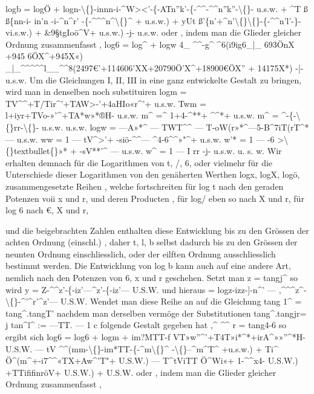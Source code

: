 \documentclass[12pt,a4paper]{article}
\begin{document}
logb  =       logÖ  +  logn-\textbackslash\{\}-innn-i-\^{}W><'-\{-ATn''k'-\{-\^{}\^{}-\^{}\^{}n''k''-\textbackslash\{\}-  u.s.w. +       \^{}T   ß  ß\{nn-i-  in'n  -i-\^{}n\^{}r'  -\{-\^{}\^{}\^{}n\^{}\textbackslash\{\}\^{}  +  u.s.w.) +     yUt    ß'\{n'+\^{}n'\textbackslash\{\}\textbackslash\{\}-\{-\^{}\^{}n'l'-\}-  vi.s.w.) +  \&9§tgIoö\^{}V+  u.s.w.) -j-  u.s.w. oder ,  indem  man  die  Glieder  gleicher  Ordnung  zusammenfasst , log6  =  log\^{}  +  logw 4\_    \^{}\^{}-g\^{}    \^{}6(i9ig6\_|\_    693ÖnX  +945  6ÖX\^{}+945X«) \_|\_\^{}\^{}\^{}\^{}\^{}l\_\_\^{}\^{}8(2497€'+114606'XX+20790Ö'X\^{}+18900€ÖX'' +  14175X*) -|-  u.s.w. Um  die  Gleichungen  I,  II,  III  in  eine  ganz  entwickelte  Gestalt  zu  bringen, wird  man  in  denselben  noch  substituiren logm  =  TV\^{}\^{}+T/Tir\^{}'+TAW>-'+4aHIo«r\^{}'+  u.s.w. Twm  =  l+iyr+TVo-»'\^{}+TA*w»*®H-  u.s.w. m\^{}  =\^{}  1+4-\^{}**+  \^{}\^{}*+  u.s.w. m\^{}  =  \^{}-\{-\textbackslash\{\}rr-\textbackslash\{\}-  u.s.w. u.s.w. logw  =     ---A»*\^{}  ---  TWT\^{}\^{}  ---  T-oW(r»*\^{}---5-B\^{}7iT(rT\^{}*---  u.s.w. ww  =  1  ---  tV\^{}>'+ -siö-\^{}\^{}---  \^{}4-6\^{}\^{}»"\^{}+  u.s.w. w'*  =  1 --- -6  >\textbackslash\{\}textbullet\{\}»*  + -sV**'\^{}    ---  u.s.w. w\^{}  =  1 ---  I  rr  -j-  u.s.w. u.  s.  w. Wir  erhalten  demnach  für  die  Logarithmen  von  t,  /,  6,  oder  vielmehr  für  die Unterschiede  dieser  Logarithmen  von  den  genäherten  Werthen  logx,  logX,  logö, zusammengesetzte  Reihen ,  welche  fortschreiten für  log  t  nach  den  geraden  Potenzen  voii  x  und  r,  und  deren  Producten , für  log/  eben  so  nach  X  und  r, für  log  6  nach  €,  X  und  r,

und  die  beigebrachten  Zahlen  enthalten  diese  Entwicklung  bis  zu  den  Grössen der  achten  Ordnung  (einschl.) ,  daher  t,  l,  b  selbst  dadurch  bis  zu  den  Grössen der  neunten  Ordnung  einschliesslich,  oder  der  eilften  Ordnung  ausschliesslich bestimmt  werden. Die  Entwicklung  von    log  b   kann  auch  auf  eine  andere  Art,  nemlich  nach den  Potenzen  von    6,  x  und  r  geschehen.     Setzt  man z  =  tangj\^{} so  wird y  =  Z-\^{}\^{}z'-\{-iz'---\^{}z'-\{-iz'---    U.S.W. und  hieraus =  logz-izz-]-n\^{}'  ---  ,\^{}\^{}\^{}z\^{}-\textbackslash\{\}-\^{}'\^{}r'\^{}z'---  U.S.W. Wendet  man  diese  Reihe  an  auf  die  Gleichung tang  1\^{}  =  tang\^{}.tangT' nachdem  man  derselben  vermöge  der  Substitutionen tang\^{}.tangjr=  j tan\^{}l\^{}  :=  ---TT. --- 1  c folgende  Gestalt  gegeben  hat ,\^{}    \^{}\^{}   r  =  tang4-6 so  ergibt  sich log6  =  log6  +  logm  +  im?MTT-f  VT»w''\^{}'+T4T»i*\^{}*+irA\^{}»»''\^{}*H-  U.S.W. ---  tV     \^{}\^{}(mm-\textbackslash\{\}-im*TT-\{-\^{}m\textbackslash\{\}\^{}  -\textbackslash\{\}--\^{}m\^{}T\^{}   +u.s.w.) +    Ti\^{}      Ö\^{}(m\^{}+-i7\^{}\^{}«TX+Aw\^{}'T"+  U.S.W.) ---  T\^{}tViTT    Ö\^{}Wi«+  1-\^{}\^{}x4-    U.S.W.) +TTififinröV+  U.S.W.) +    U.S.W. oder ,  indem  man  die  Glieder  gleicher  Ordnung  zusammenfasst ,
\end{document}
